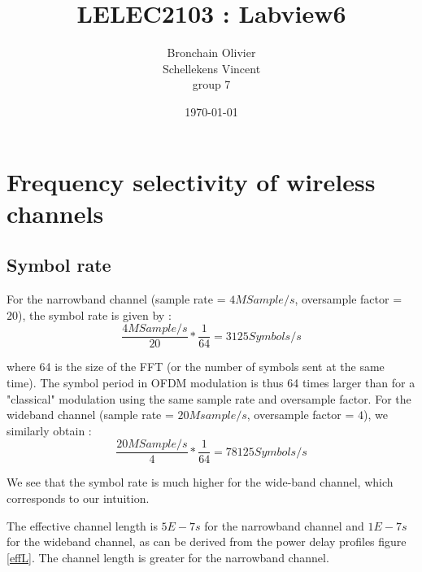 \documentclass{article}
\title{LELEC2103 : Labview6}
\author{Bronchain Olivier \\ Schellekens Vincent \\ group 7}
\date{\today}
\begin{document}
\maketitle
\section{Frequency selectivity of wireless channels}
\subsection{Symbol rate}
For the narrowband channel (sample rate = $4MSample/s$, oversample factor = $20$), the symbol rate is given by : 
\begin{equation}
\frac{4MSample/s}{20}*\frac{1}{64} = 3125 Symbols/s
\end{equation}

where 64 is the size of the FFT (or the number of symbols sent at the same time). The symbol period in OFDM modulation is thus 64 times larger than for a "classical" modulation using the same sample rate and oversample factor. For the wideband channel (sample rate = $20Msample/s$, oversample factor = $4$), we similarly obtain : 
\begin{equation}
\frac{20MSample/s}{4}*\frac{1}{64} = 78125 Symbols/s
\end{equation}

We see that the symbol rate is much higher for the wide-band channel, which corresponds to our intuition. 

The effective channel length is $5E-7s$ for the narrowband channel and $1E-7s$ for the wideband channel, as can be derived from the power delay profiles figure \ref{effL}. The channel length is greater for the narrowband channel.
\end{document}
